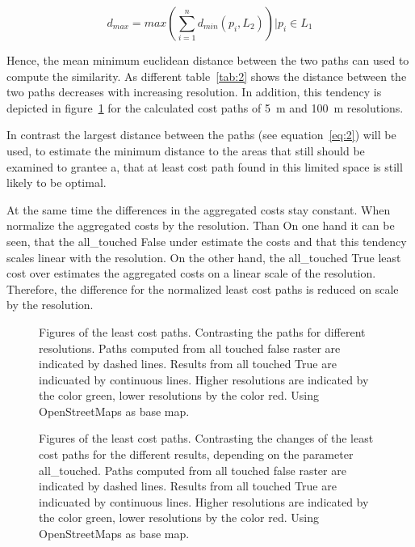 \begin{equation}
\label{eq:2}
d_{max} = max(\sum_{i=1}^{n} d_{min}(p_i, L_2)) \bigg\vert p_i \in L_1
\end{equation}

Hence, the mean minimum euclidean distance between the two paths can used to compute
the similarity.
As different table~\ref{tab:2} shows the distance between the two paths decreases
with increasing resolution.
In addition, this tendency is depicted in figure~\ref{fig:paths_resolution} for the calculated cost paths of 5~m and 100~m resolutions.

In contrast the largest distance between the paths (see equation~\ref{eq:2}) will be used, to estimate the minimum distance to the areas that still should be examined to grantee a, that at least cost path found in this limited space is still likely to be optimal.




At the same time the differences in the aggregated costs stay constant.
 When normalize the aggregated costs by the resolution.
Than On one hand it can be seen, that the all\_touched False under estimate the costs and that this tendency scales
linear with the resolution.
On the other hand, the all\_touched True least cost over estimates the aggregated costs on a linear scale of
the resolution.
Therefore, the difference for the normalized least cost paths is reduced on scale by the resolution.

\begin{figure}
	\centering

	\qquad
	\caption{Figures of the least cost paths. Contrasting the paths for different resolutions. Paths computed from all touched false raster are indicated by dashed lines. Results from all touched True are indicuated by continuous lines. Higher resolutions are indicated by the color green, lower resolutions by the color red. Using OpenStreetMaps as base map.}
	\label{fig:paths_resolution}
\end{figure}

\begin{figure}
	\centering

	\qquad

	\caption{Figures of the least cost paths. Contrasting the changes of the least cost paths for the different results, depending on the parameter all\_touched. Paths computed from all touched false raster are indicated by dashed lines. Results from all touched True are indicuated by continuous lines. Higher resolutions are indicated by the color green, lower resolutions by the color red. Using OpenStreetMaps as base map.}
	\label{fig:paths_alltouched}
\end{figure}

